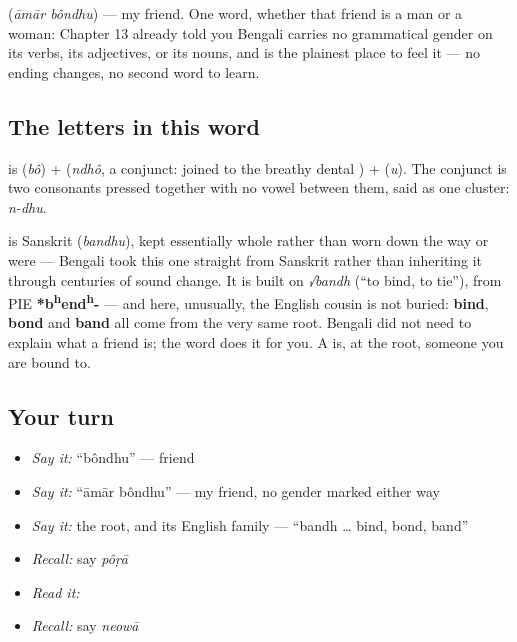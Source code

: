 \textbf{ } (\emph{āmār bôndhu}) — my friend. One word, whether that friend is a man or a woman: Chapter 13 already told you Bengali carries no grammatical gender on its verbs, its adjectives, or its nouns, and  is the plainest place to feel it — no ending changes, no second word to learn.

\subsection*{The letters in this word}
\textbf{} is \textbf{} (\emph{bô}) + \textbf{} (\emph{ndhô}, a conjunct:  joined to the breathy dental ) + \textbf{} (\emph{u}). The conjunct is two consonants pressed together with no vowel between them, said as one cluster: \emph{n-dhu}.

\begin{cousinweb}
\textbf{} is Sanskrit \textbf{} (\emph{bandhu}), kept essentially whole rather than worn down the way  or  were — Bengali took this one straight from Sanskrit rather than inheriting it through centuries of sound change. It is built on \emph{√bandh} (\textquotedblleft{}to bind, to tie\textquotedblright{}), from PIE \textbf{*b\textsuperscript{h}end\textsuperscript{h}-} — and here, unusually, the English cousin is not buried: \textbf{bind}, \textbf{bond} and \textbf{band} all come from the very same root. Bengali did not need to explain what a friend is; the word does it for you. A  is, at the root, someone you are bound to.
\end{cousinweb}

\subsection*{Your turn}
\begin{itemize}
\raggedright
  \item \emph{Say it:} \textquotedblleft{}bôndhu\textquotedblright{} — friend
  \item \emph{Say it:} \textquotedblleft{}āmār bôndhu\textquotedblright{} — my friend, no gender marked either way
  \item \emph{Say it:} the root, and its English family — \textquotedblleft{}bandh … bind, bond, band\textquotedblright{}
  \item \emph{Recall:} say \emph{pôṛā}
  \item \emph{Read it:} \textbf{}
  \item \emph{Recall:} say \emph{neowā}
\end{itemize}

